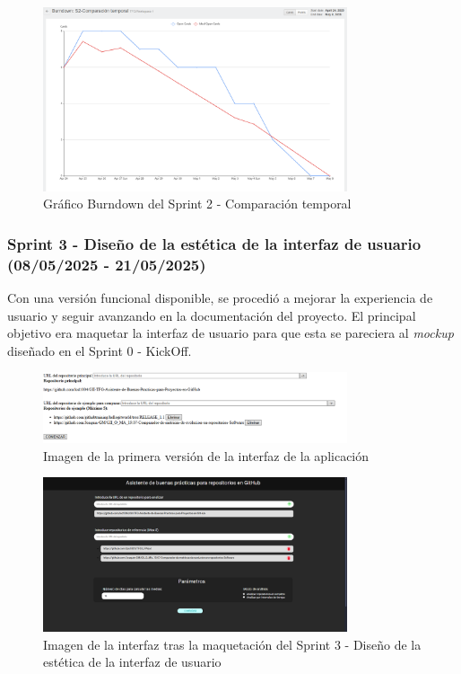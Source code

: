 \begin{figure}[H]
\centering
\includegraphics[width=0.8\textwidth]{img/BurndownS2.png}
\caption{Gráfico Burndown del Sprint 2 - Comparación temporal}
\label{fig:BurndownS2}
\end{figure}

\subsubsection{Sprint 3 - Diseño de la estética de la interfaz de usuario (08/05/2025 - 21/05/2025)}

Con una versión funcional disponible, se procedió a mejorar la experiencia de usuario y seguir avanzando en la documentación del proyecto. El principal objetivo era maquetar la interfaz de usuario para que esta se pareciera al \textit{mockup} diseñado en el Sprint 0 - KickOff.

\begin{figure}[H]
\centering
\includegraphics[width=0.8\textwidth]{img/Interfaz inicial.png}
\caption{Imagen de la primera versión de la interfaz de la aplicación}
\label{fig:Interfaz inicial}
\end{figure}

\begin{figure}[H]
\centering
\includegraphics[width=0.8\textwidth]{img/Interfaz intermedia.png}
\caption{Imagen de la interfaz tras la maquetación del Sprint 3 - Diseño de la estética de la interfaz de usuario}
\label{fig:Interfaz intermedia}
\end{figure}

